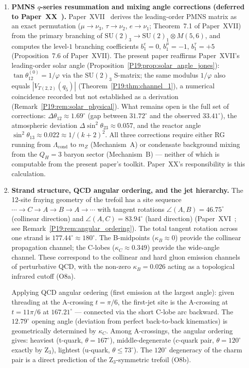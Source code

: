 \documentclass[11pt,a4paper]{article}
\theoremstyle{definition}\newtheorem{definition}[theorem]{Definition}
\theoremstyle{remark}
\newcommand{\vp}{\varphi}
\newcommand{\QH}{Q_H}
\newcommand{\Jones}{V}
\begin{document}
\begin{enumerate}[leftmargin=2em,label=\textbf{O\arabic*.}]
\item \textbf{PMNS $q$-series resummation and mixing angle corrections
  (deferred to Paper~XX~\cite{Paper20}).}
Paper~XVII~\cite{Paper17} derives the leading-order PMNS matrix
as an exact permutation
($\mu\to\nu_3$, $\tau\to\nu_2$, $e\to\nu_1$; Theorem~7.1 %
of Paper~XVII) from the primary branching of
$\mathrm{SU}(2)_3\to\mathrm{SU}(2)_1\otimes M(5,6)$, and
computes the level-$1$ branching coefficients
$b_1^e=0$, $b_1^\mu=-1$, $b_1^\tau=+5$ (Proposition~7.6 %
of Paper~XVII).
The present paper reaffirms Paper~XVII's leading-order solar angle
(Proposition~\ref{P19:prop:solar_angle_jones}): $\tan\theta_{12}^{(0)}
=1/\vp$ via the $\mathrm{SU}(2)_3$ S-matrix; the same modulus $1/\vp$
also equals $|\Jones_{T(2,2)}(q_5)|$
(Theorem~\ref{P19:thm:channel_1}), a numerical coincidence recorded
but not established as a derivation (Remark~\ref{P19:rem:solar_physical}).
What remains open is the full set of corrections:
$\Delta\theta_{12}\approx1.69^\circ$ (gap between $31.72^\circ$ and
the observed $33.41^\circ$), the atmospheric deviation
$\Delta\sin^2\theta_{23}\approx0.057$, and the reactor angle
$\sin^2\theta_{13}\approx0.022\approx1/(k+2)^2$.
All three corrections require either RG running from
$\Lambda_{\mathrm{cond}}$ to $m_Z$ (Mechanism~A) or
condensate background mixing from the $\QH=3$ baryon sector
(Mechanism~B) --- neither of which is computable from the present
paper's toolkit.  Paper~XX's responsibility is this calculation.

\item \textbf{Strand structure, QCD angular ordering, and the jet hierarchy.}
The 12-site fraying geometry of the trefoil has a site sequence
$\cdots\to C\to A\to B\to A\to\cdots$ with tangent rotations
$\angle(A,B)=46.75^\circ$ (collinear direction) and
$\angle(A,C)=83.94^\circ$ (hard direction)
(Paper~XVI~\cite{Paper16}; see Remark~\ref{P19:rem:angular_ordering}).
The total tangent rotation across one strand is $177.44^\circ\approx180^\circ$.
The B-midpoints ($\kappa_B\approx0$) provide the collinear propagation
channel; the C-lobes ($\kappa_C\approx0.349$) provide the wide-angle
channel.  These correspond to the collinear and hard gluon emission
channels of perturbative QCD, with the non-zero $\kappa_B=0.026$
acting as a topological infrared cutoff (O8a).

Applying QCD angular ordering (first emission at the largest angle):
given threading at the A-crossing $t=\pi/6$, the first-jet site is
the A-crossing at $t=11\pi/6$ at $167.21^\circ$ --- connected via
the short C-lobe arc backward.  The $12.79^\circ$ opening angle
(deviation from perfect back-to-back kinematics) is geometrically
determined by $\kappa_C$.  Among A-crossings, the angular ordering
gives: heaviest (t-quark, $\theta=167^\circ$), middle-degenerate
(c-quark pair, $\theta=120^\circ$ exactly by Z$_3$), lightest
(u-quark, $\theta\leq73^\circ$).  The $120^\circ$ degeneracy of
the charm pair is a direct prediction of the Z$_3$-symmetric trefoil
(O8b).


\end{enumerate}
\end{document}
